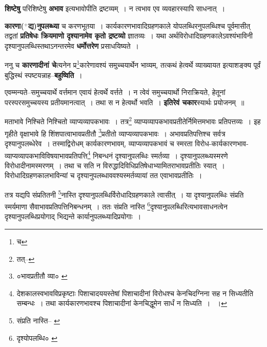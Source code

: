 \documentclass[article,12pt,a4paper]{memoir}
\newcommand{\add}[1]{($^{+}$#1)}
\begin{document}
	  \pstart \textbf{शिष्टेषु} परिशिष्टेषु \textbf{अभाव} इत्यभावोपीति द्रष्टव्यम् । न त्वभाव एव व्यवहारस्यापि साधनात् ।
	\pend
      

	  \pstart \textbf{कारणा\add{द्य}नुपलब्ध्या} च करणभूतया । कार्यकारणभावादिग्रहणकाले योपलब्धिरनुपलब्धिश्च पूर्वमासीत् तद्वतां \textbf{प्रतिषेधः क्रियमाणो दृश्यानामेव कृतो द्रष्टव्यो} ज्ञातव्यः । यथा अर्थविरोधादिग्रहणकालेऽवश्यंभाविनी दृश्यानुपलब्धिस्तथाऽनन्तरमेव \textbf{धर्मोत्तरेण} प्रसाधयिष्यते ।
	\pend
      

	  \pstart ननु च \textbf{कारणादीनां चे}त्यनेन प्र\footnote{च}\-कारेणावश्यं समुच्चयार्थेन भाव्यम्, तत्कथं हेत्वर्थे व्याख्यायत इत्याशङ्क्य पूर्वं बुद्धिस्थं स्पष्टयन्नाह--\textbf{बहुष्विति} ।
	\pend
      

	  \pstart एवम्मन्यते--समुच्चयार्थे वर्त्तमान एवायं हेत्वर्थे वर्त्तते । न त्वेवं समुच्चयार्थो निराक्रियते, हेतूनां परस्परसमुच्चयस्य प्रतीयमानत्वात् । तथा स न हेत्वर्थो भवति । \textbf{इतिरेवं चकार}स्यार्थः प्रयोजनम् ॥
	\pend
	  \bigskip
	  \begingroup
	

	  \pstart मताभावे निश्चिते निश्चितो व्याप्यव्यापकभावः । तत्र\footnote{तत्--\cite{dp-msC}} व्याप्यव्यापकभावप्रतीतेर्निमित्तमभावः प्रतिपत्तव्यः । इह गृहीते वृक्षाभावे हि शिंशपात्वाभावप्रतीतौ \footnote{०भावप्रतीतौ व्या० \cite{dp-msB}}\-प्रतीतो व्याप्यव्यापकभावः । अभावप्रतिपत्तिश्च सर्वत्र दृश्यानुपलब्धेरेव । तस्माद्विरोधम् कार्यकारणभावम्, व्याप्यव्यापकभावं च स्मरता विरोध-कार्यकारणभाव-व्याप्यव्यापकभाविविषयाभावप्रतिपत्ति\footnote{देशकालस्वभावविप्रकृष्टाः पिशाचादययस्तेषां पिशाचादीनां विरोधश्च केनचिदग्निना सह न सिध्यतीति सम्बन्धः । तथा कार्यकारणभावश्च पिशाचादीनां केनचिद्धूमेन सार्धं न सिध्यति । \cite{dp-msD-n} ।} निबन्धनं दृश्यानुपलब्धिः स्मर्तव्या । दृश्यानुपलब्ध्यस्मरणे विरोधादीनामस्मरणम् । तथा च सति न विरुद्धादिविधिप्रतिषेधाभ्यामितराभावप्रतीतिः स्यात् । विरोधादिग्रहणकालभाविन्यां च दृश्यानुपलब्धाववश्यस्मर्तव्यायां तत एवाभावप्रतीतिः ।
	\pend
       

	  \pstart तत्र यद्यपि संप्रतितनी \footnote{संप्रति नास्ति--\cite{dp-msA} \cite{dp-edP} \cite{dp-edH} \cite{dp-edE} \cite{dp-edN}}\-नास्ति दृश्यानुपलब्धिर्विरोधादिग्रहणकाले त्वासीत् । या दृश्यानुपलब्धिः संप्रति स्मर्यमाणा सैवाभावप्रतिपत्तिनिबन्धनम् । ततः संप्रति नास्ति \footnote{दृश्योपलब्धि० \cite{dp-msA} \cite{dp-msB} \cite{dp-edP} \cite{dp-edH} \cite{dp-edE} \cite{dp-edN}}\-दृश्यानुपलब्धिरित्यभावसाधनत्वेन दृश्यानुपलब्धिप्रयोगाद् भिद्यन्ते कार्यानुपलब्ध्यादिप्रयोगाः ।
	\pend
      
	  \endgroup
	
\end{document}
